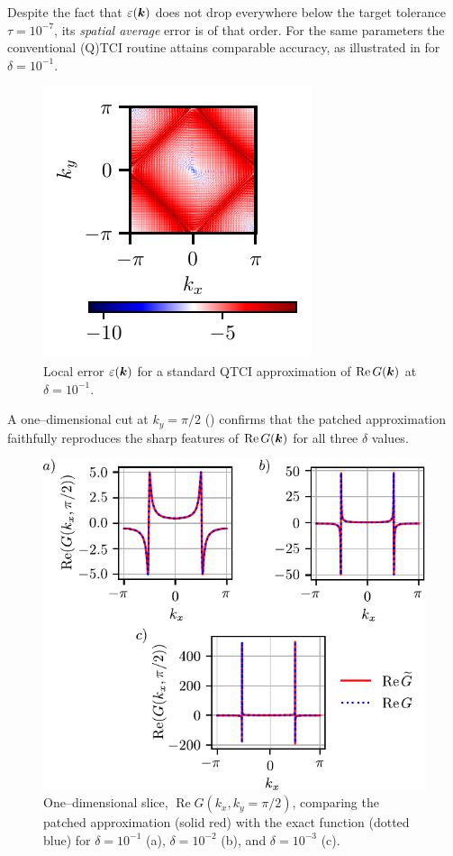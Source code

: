 Despite the fact that \(\varepsilon(\boldsymbol{k})\) does not drop everywhere below the target tolerance \(\tau=10^{-7}\), its \emph{spatial average} error is of that
order. For the same parameters the conventional (Q)TCI routine attains comparable accuracy, as illustrated in  for \(\delta=10^{-1}\).
\begin{figure}[htbp]
    \centering
    \includegraphics{figures/heatmap_TCI_error_2DGreen_ω_0.1_δ_0.1_R_15_abstol_1.0e-7_unfol_fused.pdf}
    \caption{Local error \(\varepsilon(\boldsymbol{k})\) for a standard QTCI approximation of \(\operatorname{Re}G(\boldsymbol{k})\) at \(\delta=10^{-1}\).}
    \label{fig:TCI2DGreenerror}
\end{figure}
A one–dimensional cut at \(k_{y}=\pi/2\) () confirms that the patched approximation faithfully reproduces the sharp features of \(\operatorname{Re}G(\boldsymbol{k})\) for all three
\(\delta\) values.
\begin{figure}[htbp]
    \centering
    \includegraphics{figures/lineError2DGreen.pdf}
    \caption{One–dimensional slice,
           \(\operatorname{Re}G(k_{x},k_{y}=\pi/2)\),
           comparing the patched approximation (solid red) with the exact
           function (dotted blue) for
           \(\delta=10^{-1}\) (a),
           \(\delta=10^{-2}\) (b),
           and \(\delta=10^{-3}\) (c).}
    \label{fig:lineError2DGreen}
\end{figure}

